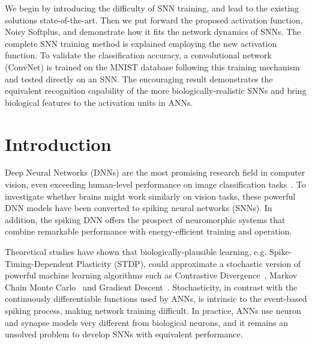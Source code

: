 We begin by introducing the difficulty of SNN training, and lead to the existing solutions state-of-the-art.
Then we put forward the proposed activation function, Noisy Softplus, and demonstrate how it fits the network dynamics of SNNs.
The complete SNN training method is explained employing the new activation function.
To validate the classification accuracy, a convolutional network (ConvNet) is trained on the MNIST database following this training mechanism and tested directly on an SNN.
The encouraging result demonstrates the equivalent recognition capability of the more biologically-realistic SNNs and bring biological features to the activation units in ANNs.

\section{Introduction}	
Deep Neural Networks (DNNs) are the most promising research field in computer vision, even exceeding human-level performance on image classification tasks~\cite{he2015delving}.
To investigate whether brains might work similarly on vision tasks, these powerful DNN models have been converted to spiking neural networks (SNNs).
In addition, the spiking DNN offers the prospect of neuromorphic systems that combine remarkable performance with energy-efficient training and operation.

Theoretical studies have shown that biologically-plausible learning, e.g. Spike-Timing-Dependent Plasticity (STDP), could approximate a stochastic version of powerful machine learning algorithms
such as 
Contrastive Divergence~\cite{neftci2013event}, Markov Chain Monte Carlo~\cite{buesing2011neural} and Gradient Descent~\cite{o2016deep}.
Stochasticity, in contrast with the continuously differentiable functions used by ANNs, is intrinsic to the event-based spiking process, making network training difficult.
In practice, ANNs use neuron and synapse models very different from biological neurons, and it remains an unsolved problem to develop SNNs with equivalent performance.

